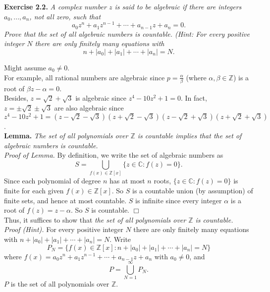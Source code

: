 \documentclass{article}
\begin{document}



\textbf{Exercise 2.2.}
\emph{A complex number $z$ is said to be algebraic if there are integers
$a_0, ..., a_n$, not all zero, such that
$$a_0 z^n + a_1 z^{n-1} + \cdots + a_{n-1} z + a_n = 0.$$
Prove that the set of all algebraic numbers is countable.
(Hint: For every positive integer $N$ there are only finitely many equations with
$$n + |a_0| + |a_1| + \cdots + |a_n| = N.$$}

Might assume $a_0 \neq 0$. \\

For example, all rational numbers are algebraic
since $p = \frac{\alpha}{\beta}$ (where $\alpha, \beta \in \mathbb{Z}$)
is a root of $\beta z - \alpha = 0$. \\

Besides, $z = \sqrt{2} + \sqrt{3}$ is algebraic since $z^4 - 10z^2 + 1 = 0$.
In fact, $z = \pm\sqrt{2} \pm\sqrt{3}$ are also algebraic since
$z^4 - 10z^2 + 1 =
(z - \sqrt{2} - \sqrt{3})(z + \sqrt{2} - \sqrt{3})
(z - \sqrt{2} + \sqrt{3})(z + \sqrt{2} + \sqrt{3})$. \\

\textbf{Lemma.}
\emph{The set of all polynomials over $\mathbb{Z}$ is countable implies that
the set of algebraic numbers is countable.} \\

\emph{Proof of Lemma.}
By definition, we write the set of algebraic numbers as
$$S = \bigcup_{f(x) \in \mathbb{Z}[x]} \{ z \in \mathbb{C} : f(z) = 0 \}.$$
Since each polynomial of degree $n$ has at most $n$ roots,
$\{ z \in \mathbb{C} : f(z) = 0 \}$ is finite for each given $f(x) \in \mathbb{Z}[x]$.
So $S$ is a countable union (by assumption) of finite sets, and hence at most countable.
$S$ is infinite since every integer $\alpha$ is a root of $f(z) = z - \alpha$.
So $S$ is countable.
$\Box$ \\

Thus, it suffices to show that
\emph{the set of all polynomials over $\mathbb{Z}$ is countable.} \\

\emph{Proof (Hint).}
For every positive integer $N$ there are only finitely many equations with
$n + |a_0| + |a_1| + \cdots + |a_n| = N.$
Write
$$P_N = \{ f(x) \in \mathbb{Z}[x] : n + |a_0| + |a_1| + \cdots + |a_n| = N \}$$
where $f(x) = a_0 z^n + a_1 z^{n-1} + \cdots + a_{n-1} z + a_n$ with $a_0 \neq 0$,
and
$$P = \bigcup_{N = 1}^{\infty} P_N.$$
$P$ is the set of all polynomials over $\mathbb{Z}$. \\
\end{document}
